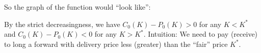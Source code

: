 \begin{enumerate}
So the graph of the function would ``look like'':
\begin{center}
\end{center}
\begin{note}
By the strict decreasingness, we have \(C_0(K)-P_0(K)>0\) for any \(K<K^*\) and
\(C_0(K)-P_0(K)<0\) for any \(K>K^*\). Intuition: We need to pay (receive)
 to long a forward with delivery price less (greater) than
the ``fair'' price \(K^*\).
\end{note}
\end{enumerate}
